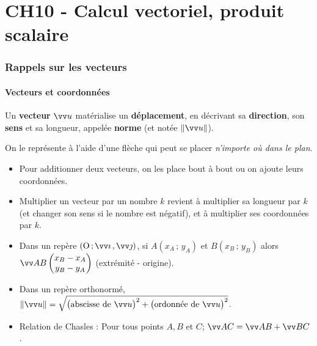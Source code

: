 \documentclass[a4paper,11pt]{article}
\author{Pierquet}
\title{\nomfichier}
\begin{document}
\newcommand{\coord}[3]{\vect{#1}\begin{pmatrix}#2\\#3\end{pmatrix}}

\pagestyle{fancy}

\part{CH10 - Calcul vectoriel, produit scalaire}

\section{Rappels sur les vecteurs}

\subsection{Vecteurs et coordonnées}

\begin{cdefi}
Un \textbf{vecteur} $\vect{u}$ matérialise un \textbf{déplacement}, en décrivant sa \textbf{direction}, son \textbf{sens} et sa longueur, appelée \textbf{norme} (et notée $\| \vect{u} \|$).

On le représente à l'aide d'une flèche qui peut se placer \emph{n'importe où dans le plan}.
\end{cdefi}

\begin{cprop}[s]
\vspace{-0.2cm}
\begin{itemize}[leftmargin=*]
	\item Pour additionner deux vecteurs, on les place bout à bout ou on ajoute leurs coordonnées.
	\item Multiplier un vecteur par un nombre $k$ revient à multiplier sa longueur par $k$ (et changer son sens si le nombre est négatif), et à multiplier ses coordonnées par $k$.
	\item Dans un repère $\Rij$, si $A(x_A\,;\,y_A)$ et $ B(x_B\,;\,y_B)$ alors $\vect{AB}\coordeux{x_B-x_A}{y_B-y_A}$ (extrémité - origine).
	\item Dans un repère orthonormé, $\| \vect{u} \| = \sqrt{\big(\text{abscisse de } \vect{u}\big)^2+\big(\text{ordonnée de } \vect{u}\big)^2}$.
	\item Relation de Chasles : Pour tous points $A, B$ et $C$; $\vect{AC}=\vect{AB}+\vect{BC}$.
\end{itemize}
\end{cprop}
\end{document}
